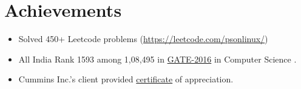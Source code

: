 \documentclass[a4paper,10pt]{article}
\begin{document}
	\section{Achievements}
	\begin{itemize}
		\item Solved 450+ Leetcode problems (\url{https://leetcode.com/psonlinux/})
		\item All India Rank 1593 among 1,08,495  in \href{https://drive.google.com/file/d/0B-2PYJZE99wQb1NCVHZFQjBsb0U/view}{GATE-2016} in Computer Science .
                \item Cummins Inc.’s client provided \href{https://drive.google.com/file/d/0B2kfGzkUmzWdbHJJZTRSLWJRVEE/view}{certificate} of appreciation.
	\end{itemize}
\end{document}
